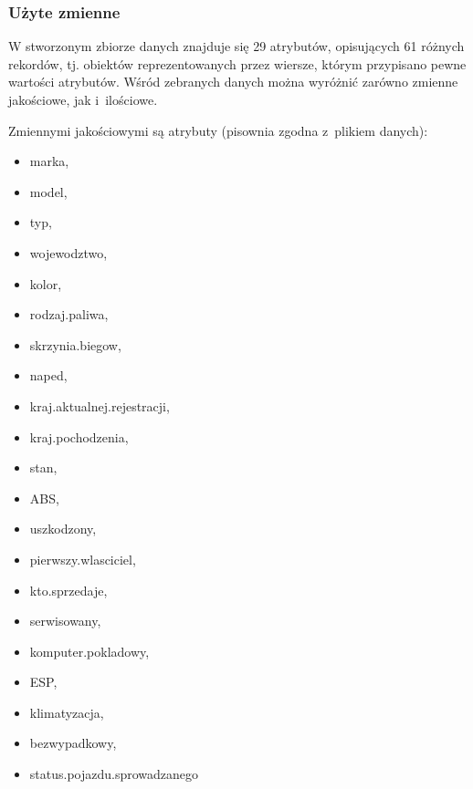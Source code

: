 \documentclass[12pt,a4paper]{report}
\begin{document}
\subsubsection{Użyte zmienne}


W stworzonym zbiorze danych znajduje się 29 atrybutów, opisujących 61 różnych rekordów, tj. obiektów reprezentowanych przez wiersze, którym przypisano pewne wartości atrybutów. Wśród zebranych danych można wyróżnić zarówno zmienne jakościowe, jak i~ilościowe. 

Zmiennymi jakościowymi są atrybuty (pisownia zgodna z~plikiem danych):
\begin{multicols}{3} 
\begin{itemize}
	\item marka,
	\item model,
	\item typ,
	\item wojewodztwo,
	\item kolor,
	\item rodzaj.paliwa,
	\item skrzynia.biegow,
	\item naped,
	\item kraj.aktualnej.rejestracji,%
	\item kraj.pochodzenia,%
	\item stan,
	\item ABS,
	\item uszkodzony,
	\item pierwszy.wlasciciel,%
	\item kto.sprzedaje,%
	\item serwisowany,%
	\item komputer.pokladowy,%
	\item ESP,
	\item klimatyzacja,%
	\item bezwypadkowy,%
	\item status.pojazdu.sprowadzanego%
\end{itemize}
\end{multicols}

%
\end{document}
